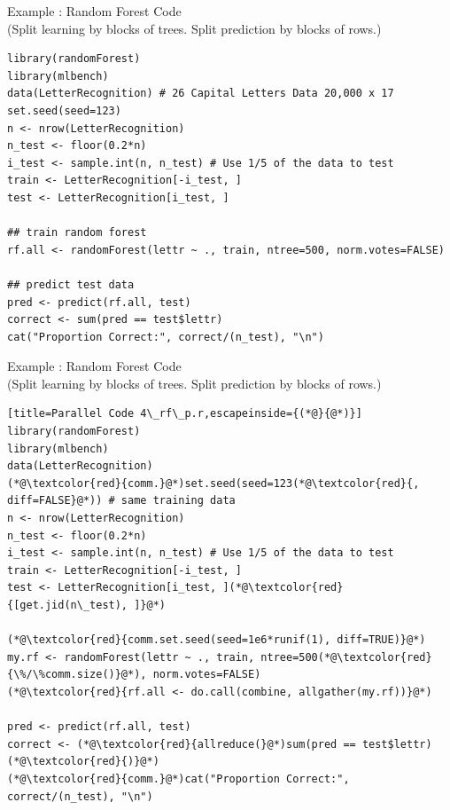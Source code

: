 \begin{frame}[fragile]
  \begin{exampleblock}{Example \showex :  Random Forest Code \\
      (Split learning by blocks of trees. Split prediction by blocks
      of rows.)}\pause
    \begin{lstlisting}[title=Serial Code 4\_rf\_s.r]
library(randomForest)
library(mlbench)
data(LetterRecognition) # 26 Capital Letters Data 20,000 x 17
set.seed(seed=123)
n <- nrow(LetterRecognition)
n_test <- floor(0.2*n)
i_test <- sample.int(n, n_test) # Use 1/5 of the data to test
train <- LetterRecognition[-i_test, ]
test <- LetterRecognition[i_test, ]

## train random forest
rf.all <- randomForest(lettr ~ ., train, ntree=500, norm.votes=FALSE)

## predict test data
pred <- predict(rf.all, test)
correct <- sum(pred == test$lettr)
cat("Proportion Correct:", correct/(n_test), "\n")
    \end{lstlisting} %
  \end{exampleblock}
\end{frame}


\begin{frame}[fragile]
  \begin{exampleblock}{Example \showex :  Random Forest Code \\
      (Split learning by blocks of trees. Split prediction by blocks
      of rows.)}\pause
    \begin{lstlisting}[title=Parallel Code 4\_rf\_p.r,escapeinside={(*@}{@*)}]
library(randomForest)
library(mlbench)
data(LetterRecognition)
(*@\textcolor{red}{comm.}@*)set.seed(seed=123(*@\textcolor{red}{, diff=FALSE}@*)) # same training data
n <- nrow(LetterRecognition)
n_test <- floor(0.2*n)
i_test <- sample.int(n, n_test) # Use 1/5 of the data to test
train <- LetterRecognition[-i_test, ]
test <- LetterRecognition[i_test, ](*@\textcolor{red}{[get.jid(n\_test), ]}@*)

(*@\textcolor{red}{comm.set.seed(seed=1e6*runif(1), diff=TRUE)}@*)
my.rf <- randomForest(lettr ~ ., train, ntree=500(*@\textcolor{red}{\%/\%comm.size()}@*), norm.votes=FALSE)
(*@\textcolor{red}{rf.all <- do.call(combine, allgather(my.rf))}@*)

pred <- predict(rf.all, test)
correct <- (*@\textcolor{red}{allreduce(}@*)sum(pred == test$lettr)(*@\textcolor{red}{)}@*)
(*@\textcolor{red}{comm.}@*)cat("Proportion Correct:", correct/(n_test), "\n")
    \end{lstlisting} %
  \end{exampleblock}
\end{frame}


